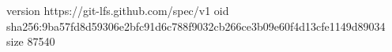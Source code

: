version https://git-lfs.github.com/spec/v1
oid sha256:9ba57fd8d59306e2bfc91d6c788f9032cb266ce3b09e60f4d13cfe1149d89034
size 87540
